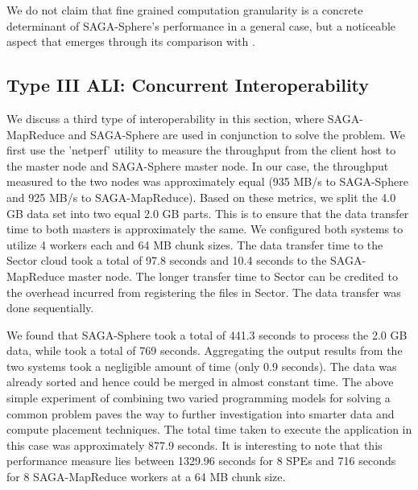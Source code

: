\documentclass[3p,twocolumn]{elsarticle}
\begin{document}

We do not claim that fine grained computation granularity is a concrete
determinant of SAGA-Sphere's performance in a general case, but a
noticeable aspect that emerges through its comparison with
\sagamapreduce.


\subsection{Type III ALI: Concurrent Interoperability}

We discuss a third type of interoperability in this section, where
SAGA-MapReduce and SAGA-Sphere are used in conjunction to solve the
\wc problem. We first use the 'netperf' utility to measure the
throughput from the client host to the \sagamapreduce master node and
SAGA-Sphere master node.  In our case, the throughput measured to the
two nodes was approximately equal (935 MB/s to SAGA-Sphere and 925
MB/s to SAGA-MapReduce).  Based on these metrics, we split the 4.0 GB
data set into two equal 2.0 GB parts. This is to ensure that the data
transfer time to both masters is approximately the same. We configured
both systems to utilize 4 workers each and 64 MB chunk sizes. The data
transfer time to the Sector cloud took a total of 97.8 seconds and
10.4 seconds to the SAGA-MapReduce master node. The longer transfer
time to Sector can be credited to the overhead incurred from
registering the files in Sector. The data transfer was done
sequentially.  
  

We found that SAGA-Sphere took a total of 441.3 seconds to process the
2.0 GB data, while \sagamapreduce took a total of 769
seconds. Aggregating the output results from the two systems took a
negligible amount of time (only 0.9 seconds). The data was already
sorted and hence could be merged in almost constant
time. %
The above simple experiment of combining two varied programming models
for solving a common problem paves the way to further investigation
into smarter data and compute placement techniques.  The total time
taken to execute the \wc application in this case was approximately
877.9 seconds. It is interesting to note that this performance measure
lies between 1329.96 seconds for 8 SPEs and 716 seconds for 8
SAGA-MapReduce workers at a 64 MB chunk size.
\end{document}
